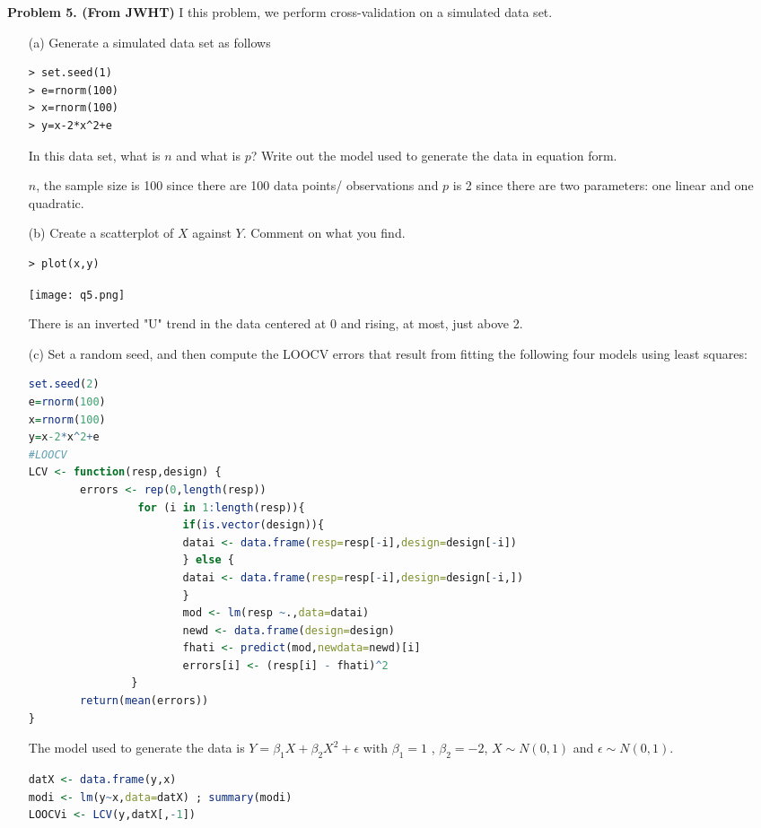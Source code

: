 \documentclass[11pt]{report}
\begin{document}
\newpage
\noindent
{\bf Problem 5. (From JWHT)} I this problem, we perform cross-validation on a simulated data set. 
\begin{itemize}
\item[(a) ] Generate a simulated data set as follows
\begin{verbatim}
> set.seed(1)
> e=rnorm(100)
> x=rnorm(100)
> y=x-2*x^2+e
\end{verbatim}
In this data set, what is $n$ and what is $p$? Write out the model used to generate the data in equation form.

$n$, the sample size is 100 since there are 100 data points/ observations and $p$ is 2 since there are two parameters: one linear and one quadratic.

\item[(b) ] Create a scatterplot of $X$ against $Y$. Comment on what you find.
\begin{verbatim}
> plot(x,y)
\end{verbatim}
\texttt{[image: q5.png]}

There is an inverted "U" trend in the data centered at 0 and rising, at most, just above 2.

\item[(c) ] Set a random seed, and then compute the LOOCV errors that result from fitting the following four models using least squares:
\begin{itemize}

\begin{lstlisting}[language=R]
set.seed(2)
e=rnorm(100)
x=rnorm(100)
y=x-2*x^2+e
#LOOCV 
LCV <- function(resp,design) {
        errors <- rep(0,length(resp))
                 for (i in 1:length(resp)){
                        if(is.vector(design)){
                        datai <- data.frame(resp=resp[-i],design=design[-i])
                        } else {
                        datai <- data.frame(resp=resp[-i],design=design[-i,])        
                        }
                        mod <- lm(resp ~.,data=datai)
                        newd <- data.frame(design=design)
                        fhati <- predict(mod,newdata=newd)[i]
                        errors[i] <- (resp[i] - fhati)^2
                }
        return(mean(errors))
}
\end{lstlisting}
The model used to generate the data is $Y=\beta_1X+\beta_2X^{2}+\epsilon$ with $\beta_1=1$ , $\beta_2=-2$, $X \sim N(0,1)$ and $\epsilon \sim N(0,1)$.

\begin{lstlisting}[language=R]
datX <- data.frame(y,x)
modi <- lm(y~x,data=datX) ; summary(modi)
LOOCVi <- LCV(y,datX[,-1])
\end{lstlisting}


\end{itemize}
\end{itemize}
\end{document}
